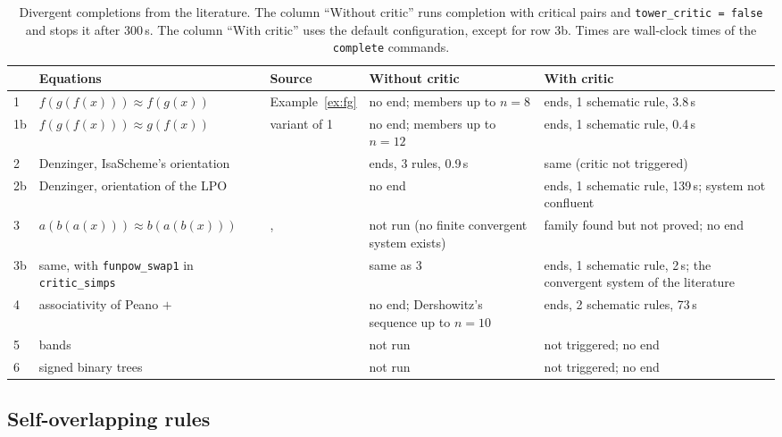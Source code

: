 \documentclass[preprint,12pt]{elsarticle}
\newcommand{\isa}[1]{\texttt{#1}}
\begin{document}
\begin{table}[t]
\centering
\small
\caption{Divergent completions from the literature. The column ``Without
critic'' runs completion with critical pairs and
\isa{tower\_critic = false} and stops it after 300\,s. The column
``With critic'' uses the default configuration, except for row 3b. Times
are wall-clock times of the \isa{complete} commands.}
\label{tab:results}
\begin{tabular}{@{}l>{\raggedright}p{3.3cm}>{\raggedright}p{2.1cm}>{\raggedright}p{2.7cm}>{\raggedright\arraybackslash}p{3.3cm}@{}}
\toprule
& Equations & Source & Without critic & With critic\\
\midrule
1 & $f(g(f(x))) \approx f(g(x))$ & Example~\ref{ex:fg} &
  no end; members up to $n = 8$ &
  ends, 1 schematic rule, 3.8\,s\\
1b & $f(g(f(x))) \approx g(f(x))$ & variant of 1 &
  no end; members up to $n = 12$ &
  ends, 1 schematic rule, 0.4\,s\\
2 & Denzinger, IsaScheme's orientation & \cite[Fig.~48]{BurghardtHeinz96} &
  ends, 3 rules, 0.9\,s & same (critic not triggered)\\
2b & Denzinger, orientation of the LPO & \cite[Fig.~48]{BurghardtHeinz96} &
  no end & ends, 1 schematic rule, 139\,s; system not confluent\\
3 & $a(b(a(x))) \approx b(a(b(x)))$ &
  \cite{KapurNarendran85}, \cite[Ex.~1]{HirokawaMiddeldorpSternagelWinkler17} &
  not run (no finite convergent system exists) & family found but not proved; no end\\
3b & same, with \isa{funpow\_swap1} in \isa{critic\_simps} & & same as 3 &
  ends, 1 schematic rule, 2\,s; the convergent system of the literature\\
4 & associativity of Peano $+$ & \cite[\S4.4]{Dershowitz89} &
  no end; Dershowitz's sequence up to $n = 10$ & ends, 2 schematic rules, 73\,s\\
5 & bands & \cite[\S2.4]{Dershowitz89} & not run & not triggered; no end\\
6 & signed binary trees & \cite[Ex.~2.1]{Kirchner89} & not run & not triggered; no end\\
\bottomrule
\end{tabular}
\end{table}

\subsection{Self-overlapping rules}
\end{document}
